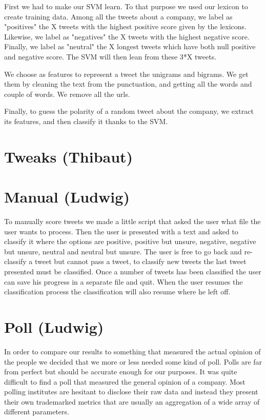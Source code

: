 \documentclass[a4paper,11pt]{report}
\begin{document}
First we had to make our SVM learn. To that purpose we used our lexicon to create training data. Among all the tweets about a company, we label as "positives" the X tweets with the highest positive score given by the lexicons. Likewise, we label as "negatives" the X tweets with the highest negative score. Finally, we label as "neutral" the X longest tweets which have both null positive and negative score. The SVM will then lean from these 3*X tweets.

We choose as features to represent a tweet the unigrams and bigrams. We get them by cleaning the text from the punctuation, and getting all the words and couple of words. We remove all the urls.

Finally, to guess the polarity of a random tweet about the company, we extract its features, and then classify it thanks to the SVM.

\section{Tweaks (Thibaut)}

\section{Manual (Ludwig)}
To manually score tweets we made a little script that asked the user what file the user wants to process. 
Then the user is presented with a text and asked to classify it where the options are positive, positive but unsure, negative, negative but unsure, neutral and neutral but unsure. 
The user is free to go back and re-classify a tweet but cannot pass a tweet, to classify new tweets the last tweet presented must be classified. 
Once a number of tweets has been classified the user can save his progress in a separate file and quit. 
When the user resumes the classification process the classification will also resume where he left off.

\section{Poll (Ludwig)}
In order to compare our results to something that measured the actual opinion of the people we decided that we more or less needed some kind of poll. 
Polls are far from perfect but should be accurate enough for our purposes. It was quite difficult to find a poll that measured the general opinion of a company. 
Most polling institutes are hesitant to disclose their raw data and instead they present their own trademarked metrics that are usually an aggregation of a wide array of different parameters.
\end{document}
